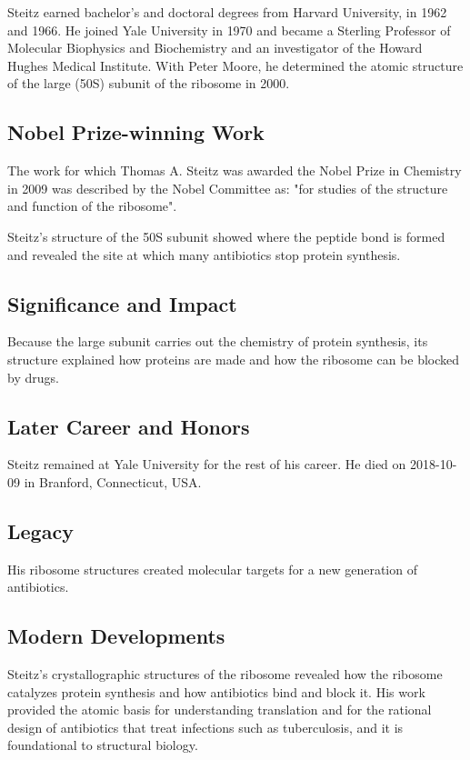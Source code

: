 Steitz earned bachelor's and doctoral degrees from Harvard University, in 1962 and 1966. He joined Yale University in 1970 and became a Sterling Professor of Molecular Biophysics and Biochemistry and an investigator of the Howard Hughes Medical Institute. With Peter Moore, he determined the atomic structure of the large (50S) subunit of the ribosome in 2000.

\subsection*{Nobel Prize-winning Work}

The work for which Thomas A. Steitz was awarded the Nobel Prize in Chemistry in 2009 was described by the Nobel Committee as: "for studies of the structure and function of the ribosome".

Steitz's structure of the 50S subunit showed where the peptide bond is formed and revealed the site at which many antibiotics stop protein synthesis.

\subsection*{Significance and Impact}

Because the large subunit carries out the chemistry of protein synthesis, its structure explained how proteins are made and how the ribosome can be blocked by drugs.

\subsection*{Later Career and Honors}

Steitz remained at Yale University for the rest of his career. He died on 2018-10-09 in Branford, Connecticut, USA.

\subsection*{Legacy}

His ribosome structures created molecular targets for a new generation of antibiotics.

\subsection*{Modern Developments}

Steitz's crystallographic structures of the ribosome revealed how the ribosome catalyzes protein synthesis and how antibiotics bind and block it. His work provided the atomic basis for understanding translation and for the rational design of antibiotics that treat infections such as tuberculosis, and it is foundational to structural biology.

